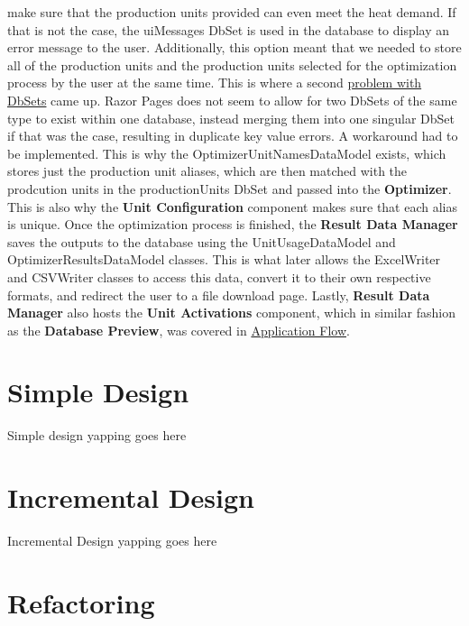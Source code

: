 \documentclass[12pt]{report}
\begin{document}
make sure that the production units provided can even meet the heat demand. If that is not the case, the uiMessages
DbSet is used in the database to display an error message to the user.
Additionally, this option meant that we needed to store all of the production units and the production units selected for 
the optimization process by the user at the same time. This is where a second \underline{problem with DbSets} came up.
Razor Pages does not seem to allow for two DbSets of the same type to exist within one database, instead
merging them into one singular DbSet if that was the case, resulting in duplicate key value errors. A workaround had to be implemented.
This is why the OptimizerUnitNamesDataModel exists, which stores just the production unit aliases, which are then matched
with the prodcution units in the productionUnits DbSet and passed into the \textbf{Optimizer}. This is also why the \textbf{Unit Configuration}
component makes sure that each alias is unique.
Once the optimization process is finished, the \textbf{Result Data Manager} saves the outputs to the database using
the UnitUsageDataModel and OptimizerResultsDataModel classes. This is what later allows the ExcelWriter and CSVWriter classes
to access this data, convert it to their own respective formats, and redirect the user to a file download page.
Lastly, \textbf{Result Data Manager} also hosts the \textbf{Unit Activations} component, which in similar fashion
as the \textbf{Database Preview}, was covered in \hyperref[sec:appflow]{Application Flow}.



\section{Simple Design}
Simple design yapping goes here

\section{Incremental Design}
Incremental Design yapping goes here

\section{Refactoring}
\end{document}

